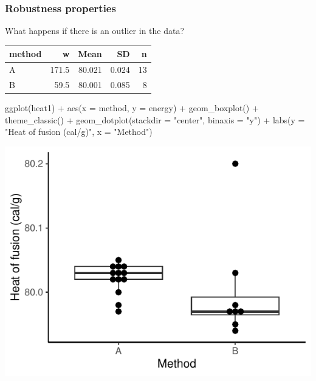 \documentclass[a4paper]{article}
\begin{document}
\subsubsection{Robustness properties}
What happens if there is an outlier in the data?
\begin{Schunk}
\begin{table}[!h]
\centering
\begin{tabular}{lrrrr}
\toprule
method & w & Mean & SD & n\\
\midrule
A & 171.5 & 80.021 & 0.024 & 13\\
B & 59.5 & 80.001 & 0.085 & 8\\
\bottomrule
\end{tabular}
\end{table}

\end{Schunk}
\begin{Schunk}
\begin{Sinput}
ggplot(heat1) + 
  aes(x = method, y = energy) + 
  geom_boxplot() + 
  theme_classic() +
  geom_dotplot(stackdir = "center",
  	binaxis = "y") +
  labs(y = "Heat of fusion (cal/g)",
    x = "Method")
\end{Sinput}


{\centering \includegraphics[width=\maxwidth]{figure/listings-unnamed-chunk-126-1} 

}

\end{Schunk}
\end{document}
